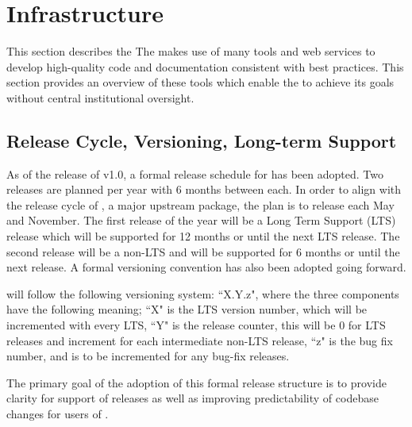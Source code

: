\section{Infrastructure}
\label{sec:infrastructure}
This section describes the 
The \sunpyproj makes use of many tools and web services to develop high-quality code and documentation consistent with best practices.
This section provides an overview of these tools which enable the \sunpyproj to achieve its goals without central institutional oversight.

\subsection{Release Cycle, Versioning, Long-term Support}
\label{sec:release}
As of the release of v1.0, a formal release schedule for \sunpypkg has been adopted.
Two releases are planned per year with 6 months between each.
In order to align with the release cycle of \astropypkg, a major upstream package, the plan is to release each May and November.
The first release of the year will be a Long Term Support (LTS) release which will be supported for 12 months or until the next LTS release.
The second release will be a non-LTS and will be supported for 6 months or until the next release.
A formal versioning convention has also been adopted going forward.

\sunpypkg will follow the following versioning system: ``X.Y.z", where the three components have the following meaning;
``X" is the LTS version number, which will be incremented with every LTS,
``Y" is the release counter, this will be 0 for LTS releases and increment for each intermediate non-LTS release,
``z" is the bug fix number, and is to be incremented for any bug-fix releases.

The primary goal of the adoption of this formal release structure is to provide clarity for support of releases as well as improving predictability of codebase changes for users of \sunpypkg.

